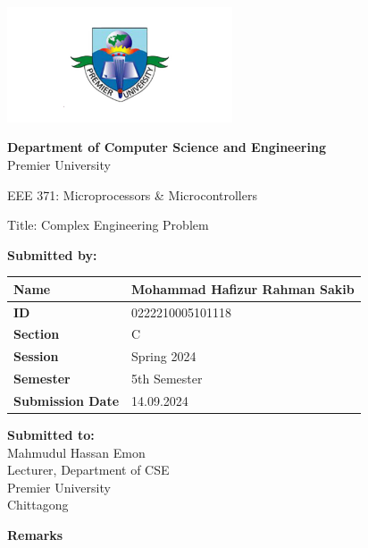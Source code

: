 \documentclass{scrreprt}
\renewcommand{\arraystretch}{1.5}
\begin{document}
\begin{titlepage}
    \centering
    \includegraphics[width=0.5\textwidth]{./logo.png} 
    \vspace{1cm}

    \textbf{Department of Computer Science and Engineering}\\
    Premier University
    \vspace{1cm}

    \huge \textnormal{EEE 371: Microprocessors \& Microcontrollers }
    \vspace{1in} 

    \Large \textnormal{Title: Complex Engineering Problem}
    \vspace{0.5in} 

    \large
    \textbf{Submitted by:}
    \vspace{0.5cm}

    \renewcommand{\arraystretch}{1.5} 
    \begin{tabular}{|p{}|p{}|}
        \hline
        \textbf{Name} & Mohammad Hafizur Rahman Sakib \\
        \hline
        \textbf{ID} & 0222210005101118 \\
        \hline
        \textbf{Section} & C \\
        \hline
        \textbf{Session} & Spring 2024 \\
        \hline
        \textbf{Semester} & 5th Semester \\
        \hline
        \textbf{Submission Date} & 14.09.2024 \\
        \hline
    \end{tabular}
    \vspace{1cm}

    \begin{minipage}[t]{0.48\textwidth}
        \textbf{Submitted to:}\\
        Mahmudul Hassan Emon\\
        Lecturer, Department of CSE\\
        Premier University\\
        Chittagong
    \end{minipage}%
    \hfill
    \begin{minipage}[t]{0.48\textwidth}
        \raggedleft
        \textbf{Remarks}\\
        \vspace{0.5cm} %
    \end{minipage}

    \date{\today}
    \vfill
\end{titlepage}
\end{document}
